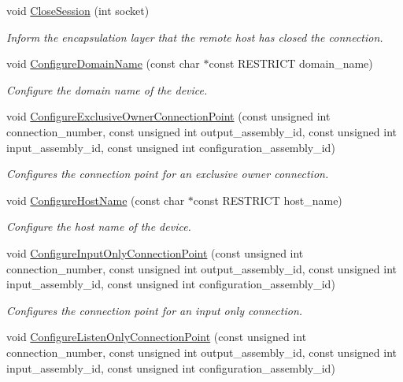\begin{DoxyCompactItemize}
void \hyperlink{group__CIP__API_gab9ff230d61fc6dedd90f8b95e9a27707}{\-Close\-Session} (int socket)
\begin{DoxyCompactList}\small\item\em \-Inform the encapsulation layer that the remote host has closed the connection. \end{DoxyCompactList}\item 
void \hyperlink{group__CIP__API_ga388b872aa3290d7248bfbf4b61fc4f1e}{\-Configure\-Domain\-Name} (const char $\ast$const \-R\-E\-S\-T\-R\-I\-C\-T domain\-\_\-name)
\begin{DoxyCompactList}\small\item\em \-Configure the domain name of the device. \end{DoxyCompactList}\item 
void \hyperlink{group__CIP__API_gad1826555a5a2c522bfd98496f31c7ab2}{\-Configure\-Exclusive\-Owner\-Connection\-Point} (const unsigned int connection\-\_\-number, const unsigned int output\-\_\-assembly\-\_\-id, const unsigned int input\-\_\-assembly\-\_\-id, const unsigned int configuration\-\_\-assembly\-\_\-id)
\begin{DoxyCompactList}\small\item\em \-Configures the connection point for an exclusive owner connection. \end{DoxyCompactList}\item 
void \hyperlink{group__CIP__API_gab4a2d826ebe9be1b60c0206414a8f8ce}{\-Configure\-Host\-Name} (const char $\ast$const \-R\-E\-S\-T\-R\-I\-C\-T host\-\_\-name)
\begin{DoxyCompactList}\small\item\em \-Configure the host name of the device. \end{DoxyCompactList}\item 
void \hyperlink{group__CIP__API_ga1f81ca8040f02503c8374288a1453f52}{\-Configure\-Input\-Only\-Connection\-Point} (const unsigned int connection\-\_\-number, const unsigned int output\-\_\-assembly\-\_\-id, const unsigned int input\-\_\-assembly\-\_\-id, const unsigned int configuration\-\_\-assembly\-\_\-id)
\begin{DoxyCompactList}\small\item\em \-Configures the connection point for an input only connection. \end{DoxyCompactList}\item 
void \hyperlink{group__CIP__API_ga0ffe2fb2fa68e86bd2c0b3a94d7ad9bb}{\-Configure\-Listen\-Only\-Connection\-Point} (const unsigned int connection\-\_\-number, const unsigned int output\-\_\-assembly\-\_\-id, const unsigned int input\-\_\-assembly\-\_\-id, const unsigned int configuration\-\_\-assembly\-\_\-id)

\end{DoxyCompactItemize}
